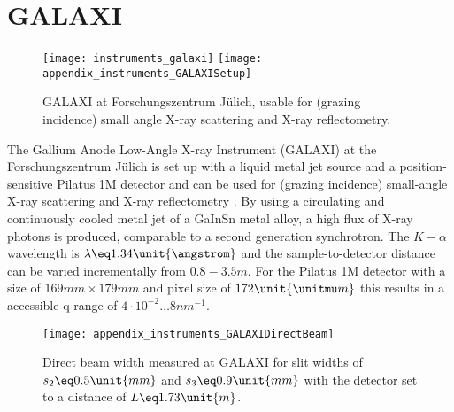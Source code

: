 \documentclass[\main/dresen_thesis.tex]{subfiles}
\begin{document}
  \section{GALAXI}\label{ch:lss:galaxi}
    \begin{figure}[ht]
      \centering
      \texttt{[image: instruments\_galaxi]}
      \texttt{[image: appendix\_instruments\_GALAXISetup]}
      \caption{\label{fig:lss:galaxi}GALAXI at Forschungszentrum J\"ulich, usable for (grazing incidence) small angle X-ray scattering and X-ray reflectometry.}
    \end{figure}

    The Gallium Anode Low-Angle X-ray Instrument (GALAXI) at the Forschungszentrum J\"ulich is set up with a liquid metal jet source and a position-sensitive Pilatus 1M detector and can be used for (grazing incidence) small-angle X-ray scattering and X-ray reflectometry \cite{FZJ_2016_GALAX}.
    By using a circulating and continuously cooled metal jet of a GaInSn metal alloy, a high flux of X-ray photons is produced, comparable to a second generation synchrotron.
    The $K-\alpha$ wavelength is $\lambda \eq 1.34 \unit{\angstrom}$ and the sample-to-detector distance can be varied incrementally from $0.8 - 3.5 \unit{m}$.
    For the Pilatus 1M detector with a size of $169 \unit{mm} \times 179 \unit{mm}$ and pixel size of $172 \unit{\unitmu m}$ this results in a accessible q-range of $4 \cdot 10^{-2} \dots 8 \unit{nm}^{-1}$.

    \begin{figure}[ht]
      \centering
      \texttt{[image: appendix\_instruments\_GALAXIDirectBeam]}
      \caption{\label{fig:lss:galaxi:directBeam}Direct beam width measured at GALAXI for slit widths of $s_2 \eq 0.5 \unit{mm}$ and $s_3 \eq 0.9 \unit{mm}$ with the detector set to a distance of $L \eq 1.73 \unit{m}$.}
    \end{figure}
\end{document}
